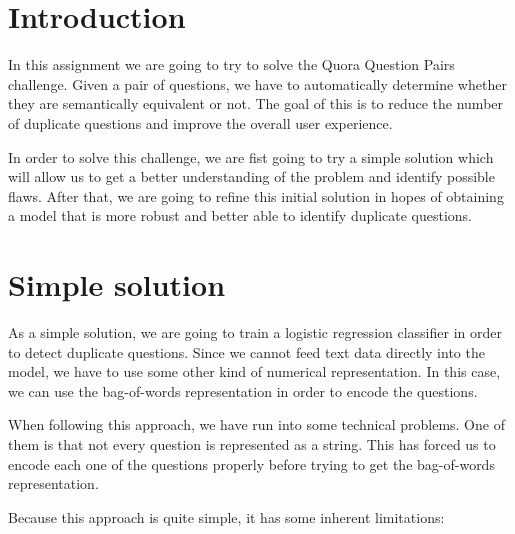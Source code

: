 \documentclass[11pt,a4paper]{article}
\begin{document}
\tableofcontents
\thispagestyle{empty}				%

\newpage

\section{Introduction}

In this assignment we are going to try to solve the Quora Question Pairs challenge.
Given a pair of questions, we have to automatically determine whether they are
semantically equivalent or not. The goal of this is to reduce the number of
duplicate questions and improve the overall user experience.

In order to solve this challenge, we are fist going to try a simple solution which
will allow us to get a better understanding of the problem and identify possible
flaws. After that, we are going to refine this initial solution in hopes of obtaining
a model that is more robust and better able to identify duplicate questions.

\section{Simple solution}

As a simple solution, we are going to train a logistic regression classifier in
order to detect duplicate questions. Since we cannot feed text data directly into
the model, we have to use some other kind of numerical representation. In this case,
we can use the bag-of-words representation in order to encode the questions.

When following this approach, we have run into some technical problems. One of
them is that not every question is represented as a string. This has forced us
to encode each one of the questions properly before trying to get the bag-of-words
representation.

Because this approach is quite simple, it has some inherent limitations:
\end{document}
